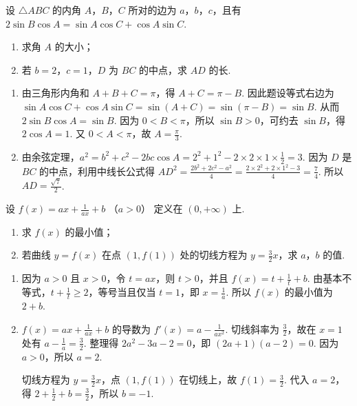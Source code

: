 \begin{problem}
设 \(\triangle ABC\) 的内角 \(A\)，\(B\)，\(C\) 所对的边为 \(a\)，\(b\)，\(c\)，且有 \(2\sin B\cos A = \sin A\cos C + \cos A\sin C\).

\begin{enumerate}
\item 求角 \(A\) 的大小；
\item 若 \(b = 2\)，\(c = 1\)，\(D\) 为 \(BC\) 的中点，求 \(AD\) 的长.
\end{enumerate}
\end{problem}

\begin{solution}
\begin{enumerate}
\item 由三角形内角和 \(A+B+C=\pi\)，得 \(A+C=\pi-B\). 因此题设等式右边为
\(\sin A\cos C+\cos A\sin C=\sin(A+C)=\sin(\pi-B)=\sin B\). 从而 \(2\sin B\cos A=\sin B\). 因为 \(0<B<\pi\)，所以 \(\sin B>0\)，可约去 \(\sin B\)，得 \(2\cos A=1\). 又 \(0<A<\pi\)，故 \(A=\frac{\pi}{3}\).
\item 由余弦定理，\(a^2=b^2+c^2-2bc\cos A=2^2+1^2-2\times2\times1\times\frac{1}{2}=3\). 因为 \(D\) 是 \(BC\) 的中点，利用中线长公式得 \(AD^2=\frac{2b^2+2c^2-a^2}{4}=\frac{2\times2^2+2\times1^2-3}{4}=\frac{7}{4}\). 所以 \(AD=\frac{\sqrt{7}}{2}\).
\end{enumerate}
\end{solution}

\begin{problem}
设 \(f(x) = ax + \frac{1}{ax} + b\) （\(a > 0\)） 定义在 \((0, +\infty)\) 上.

\begin{enumerate}
\item 求 \(f(x)\) 的最小值；
\item 若曲线 \(y = f(x)\) 在点 \((1, f(1))\) 处的切线方程为 \(y = \frac{3}{2}x\)，求 \(a\)，\(b\) 的值.
\end{enumerate}
\end{problem}

\begin{solution}
\begin{enumerate}
\item 因为 \(a>0\) 且 \(x>0\)，令 \(t=ax\)，则 \(t>0\)，并且 \(f(x)=t+\frac{1}{t}+b\). 由基本不等式，\(t+\frac{1}{t}\geqslant2\)，等号当且仅当 \(t=1\)，即 \(x=\frac{1}{a}\). 所以 \(f(x)\) 的最小值为 \(2+b\).
\item \(f(x)=ax+\frac{1}{ax}+b\) 的导数为 \(f'(x)=a-\frac{1}{ax^2}\). 切线斜率为 \(\frac{3}{2}\)，故在 \(x=1\) 处有 \(a-\frac{1}{a}=\frac{3}{2}\). 整理得 \(2a^2-3a-2=0\)，即 \((2a+1)(a-2)=0\). 因为 \(a>0\)，所以 \(a=2\).

切线方程为 \(y=\frac{3}{2}x\)，点 \((1,f(1))\) 在切线上，故 \(f(1)=\frac{3}{2}\). 代入 \(a=2\)，得 \(2+\frac{1}{2}+b=\frac{3}{2}\)，所以 \(b=-1\).
\end{enumerate}
\end{solution}


